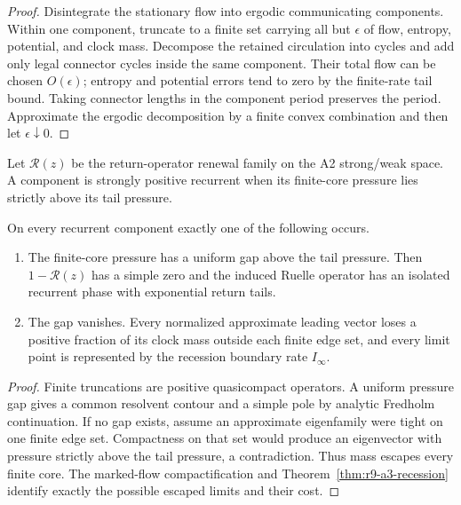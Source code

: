 \begin{proof}
Disintegrate the stationary flow into ergodic communicating components.
Within one component, truncate to a finite set carrying all but $\epsilon$ of
flow, entropy, potential, and clock mass.  Decompose the retained circulation
into cycles and add only legal connector cycles inside the same component.
Their total flow can be chosen $O(\epsilon)$; entropy and potential errors tend
to zero by the finite-rate tail bound.  Taking connector lengths in the
component period preserves the period.  Approximate the ergodic decomposition
by a finite convex combination and then let $\epsilon\downarrow0$.
\end{proof}

Let $\mathcal R(z)$ be the return-operator renewal family on the A2 strong/weak
space.  A component is strongly positive recurrent when its finite-core
pressure lies strictly above its tail pressure.

\begin{theorem}
\label{thm:r9-a3-spr}
On every recurrent component exactly one of the following occurs.
\begin{enumerate}[label=(\roman*)]
\item The finite-core pressure has a uniform gap above the tail pressure.  Then
$1-\mathcal R(z)$ has a simple zero and the induced Ruelle operator has an
isolated recurrent phase with exponential return tails.
\item The gap vanishes.  Every normalized approximate leading vector loses a
positive fraction of its clock mass outside each finite edge set, and every
limit point is represented by the recession boundary rate
$I_\infty$.
\end{enumerate}
\end{theorem}

\begin{proof}
Finite truncations are positive quasicompact operators.  A uniform pressure gap
gives a common resolvent contour and a simple pole by analytic Fredholm
continuation.  If no gap exists, assume an approximate eigenfamily were tight
on one finite edge set.  Compactness on that set would produce an eigenvector
with pressure strictly above the tail pressure, a contradiction.  Thus mass
escapes every finite core.  The marked-flow compactification and
Theorem~\ref{thm:r9-a3-recession} identify exactly the possible escaped limits
and their cost.
\end{proof}

